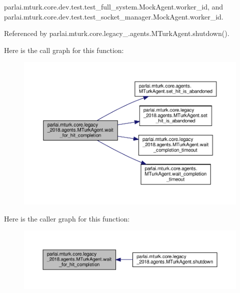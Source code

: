 parlai.\+mturk.\+core.\+dev.\+test.\+test\+\_\+full\+\_\+system.\+Mock\+Agent.\+worker\+\_\+id, and parlai.\+mturk.\+core.\+dev.\+test.\+test\+\_\+socket\+\_\+manager.\+Mock\+Agent.\+worker\+\_\+id.



Referenced by parlai.\+mturk.\+core.\+legacy\+\_.\+agents.\+M\+Turk\+Agent.\+shutdown().

Here is the call graph for this function\+:
\nopagebreak
\begin{figure}[H]
\begin{center}
\leavevmode
\includegraphics[width=350pt]{classparlai_1_1mturk_1_1core_1_1legacy__2018_1_1agents_1_1MTurkAgent_a89e1e1c284db9228d61afb3f93247b12_cgraph}
\end{center}
\end{figure}
Here is the caller graph for this function\+:
\nopagebreak
\begin{figure}[H]
\begin{center}
\leavevmode
\includegraphics[width=350pt]{classparlai_1_1mturk_1_1core_1_1legacy__2018_1_1agents_1_1MTurkAgent_a89e1e1c284db9228d61afb3f93247b12_icgraph}
\end{center}
\end{figure}
\mbox{\label{classparlai_1_1mturk_1_1core_1_1legacy__2018_1_1agents_1_1MTurkAgent_a523bffdcd46a437e641b94f5700c0e16}} 

